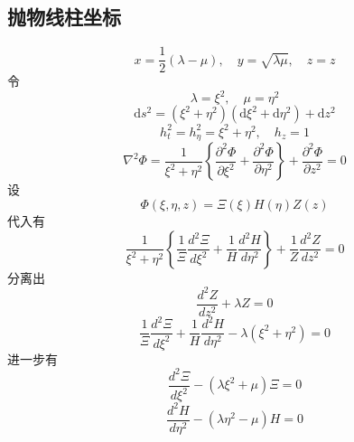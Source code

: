 \documentclass[a4paper]{ctexart}
\begin{document}
\subsection{抛物线柱坐标}
\[
    x=\frac{1}{2}(\lambda-\mu), \quad y=\sqrt{\lambda \mu}, \quad z=z
\]
令
\[
    \lambda=\xi^{2}, \quad \mu=\eta^{2}
\]
\[
    \mathrm{d} s^{2}=\left(\xi^{2}+\eta^{2}\right)\left(\mathrm{d} \xi^{2}+\mathrm{d} \eta^{2}\right)+\mathrm{d} z^{2}
\]
\[
    h_{t}^{2}=h_{\eta}^{2} =\xi^{2}+\eta^{2}, \quad h_{z}=1
\]
\[
    \nabla^{2} \Phi=\frac{1}{\xi^{2}+\eta^{2}}\left\{\frac{\partial^{2} \Phi}{\partial \xi^{2}}+\frac{\partial^{2} \Phi}{\partial \eta^{2}}\right\}+\frac{\partial^{2} \Phi}{\partial z^{2}}=0
\]
设
$$
    \Phi \left( \xi ,\eta ,z \right) =\varXi \left( \xi \right) H\left( \eta \right) Z\left( z \right)
$$
代入有
$$
    \frac{1}{\xi ^2+\eta ^2}\left\{ \frac{1}{\varXi}\frac{d^2\varXi}{d\xi ^2}+\frac{1}{H}\frac{d^2H}{d\eta ^2} \right\} +\frac{1}{Z}\frac{d^2Z}{dz^2}=0
$$
分离出
\begin{equation}
    \frac{d^2Z}{dz^2}+\lambda Z=0
\end{equation}
$$
    \frac{1}{\varXi}\frac{d^2\varXi}{d\xi ^2}+\frac{1}{H}\frac{d^2H}{d\eta ^2}-\lambda \left( \xi ^2+\eta ^2 \right) =0
$$
进一步有
\begin{equation}
    \frac{d^2\varXi}{d\xi ^2}-\left( \lambda \xi ^2+\mu \right) \varXi =0
\end{equation}
\begin{equation}
    \frac{d^2H}{d\eta ^2}-\left( \lambda \eta ^2-\mu \right) H=0
\end{equation}
\end{document}
